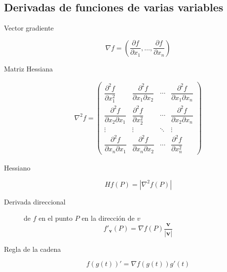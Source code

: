 \begin{multicols}{2}
\subsection*{Derivadas de funciones de varias variables}

\begin{tcolorbox}[hbox, title=Derivadas parciales]
\begin{minipage}{0.4\textwidth}
\flushleft
\begin{description}
\item[Vector gradiente]
      \[
      \nabla f = \left(\frac{\partial f}{\partial x_1},\ldots, \frac{\partial f}{\partial x_n}\right)
      \]
\item[Matriz Hessiana]
      \[
      \begin{array}{c}
      \nabla^2f=
      \left(
      \begin{array}{cccc}
      \dfrac{\partial^2 f}{\partial x_1^2}            &
      \dfrac{\partial^2 f}{\partial x_1 \partial x_2} &
      \cdots                                          &
      \dfrac{\partial^2 f}{\partial x_1 \partial x_n}                            \\
      \dfrac{\partial^2 f}{\partial x_2 \partial x_1} &
      \dfrac{\partial^2 f}{\partial x_2^2}            &
      \cdots                                          &
      \dfrac{\partial^2 f}{\partial x_2 \partial x_n}                            \\
      \vdots                                          & \vdots & \ddots & \vdots \\
      \dfrac{\partial^2 f}{\partial x_n \partial x_1} &
      \dfrac{\partial^2 f}{\partial x_n \partial x_2} &
      \cdots                                          &
      \dfrac{\partial^2 f}{\partial x_n^2}
      \end{array}
      \right)
      \end{array}
      \]
\item[Hessiano]
      \[
      Hf(P)=|\nabla^2f(P)|
      \]
\item[Derivada direccional] de $f$ en el punto $P$ en la dirección de $v$
      \[
      f'_{\mathbf{v}}(P) = \nabla f(P)\frac{\mathbf{v}}{|\mathbf{v}|}
      \]
\item[Regla de la cadena]
      \[
      f(g(t))' = \nabla f(g(t))g'(t)
      \]
\end{description}
\end{minipage}
\end{tcolorbox}


\end{multicols}
